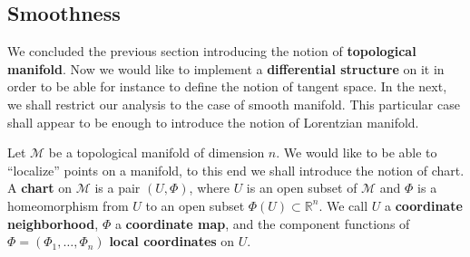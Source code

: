 \documentclass[11pt]{book}
\newcommand{\Mcal}{\mathcal{M}}
\newcommand{\Rbb}{\mathbb{R}}
\theoremstyle{break}
\begin{document}
\subsection{Smoothness}


We concluded the previous section introducing the notion of \textbf{topological manifold}. Now we would like to implement a \textbf{differential structure} on it in order to be able for instance to define the notion of tangent space. In the next, we shall restrict our analysis to the case of smooth manifold. This particular case shall appear to be enough to introduce the notion of Lorentzian manifold.


\bigskip


Let $\Mcal$ be a topological manifold of dimension $n$. We would like to be able to ``localize'' points on a manifold, to this end we shall introduce the notion of chart. A \textbf{chart} on $\Mcal$ is a pair $(U,\Phi)$, where $U$ is an open subset of $\Mcal$ and $\Phi$ is a homeomorphism from $U$ to an open subset $\Phi(U) \subset \Rbb^n$. We call $U$ a \textbf{coordinate neighborhood}, $\Phi$ a \textbf{coordinate map}, and the component functions of $\Phi=(\Phi_1,\dots,\Phi_n)$ \textbf{local coordinates} on $U$.
\end{document}
